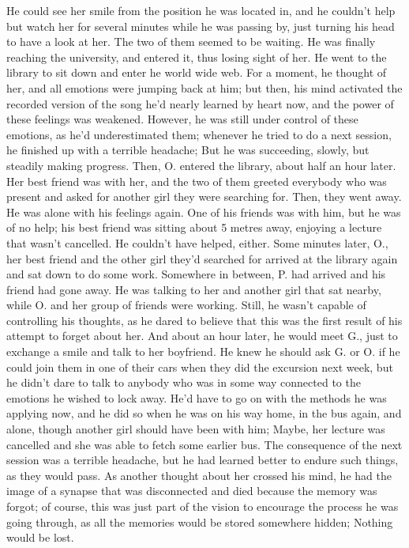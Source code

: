 He could see her smile from the position he was located in, and he couldn't help but watch her for several minutes while he was passing by, just turning his head to have a look at her. 
The two of them seemed to be waiting. 
He was finally reaching the university, and entered it, thus losing sight of her. 
He went to the library to sit down and enter he world wide web. 
For a moment, he thought of her, and all emotions were jumping back at him; but then, his mind activated the recorded version of the song he'd nearly learned by heart now, and the power of these feelings was weakened. 
However, he was still under control of these emotions, as he'd underestimated them; whenever he tried to do a next session, he finished up with a terrible headache; But he was succeeding, slowly, but steadily making progress. 
Then, O. entered the library, about half an hour later. 
Her best friend was with her, and the two of them greeted everybody who was present and asked for another girl they were searching for. 
Then, they went away. 
He was alone with his feelings again. 
One of his friends was with him, but he was of no help; his best friend was sitting about 5 metres away, enjoying a lecture that wasn't cancelled. 
He couldn't have helped, either. 
Some minutes later, O., her best friend and the other girl they'd searched for arrived at the library again and sat down to do some work. 
Somewhere in between, P. had arrived and his friend had gone away. 
He was talking to her and another girl that sat nearby, while O. and her group of friends were working. 
Still, he wasn't capable of controlling his thoughts, as he dared to believe that this was the first result of his attempt to forget about her. 
And about an hour later, he would meet G., just to exchange a smile and talk to her boyfriend. 
He knew he should ask G. or O. if he could join them in one of their cars when they did the excursion next week, but he didn't dare to talk to anybody who was in some way connected to the emotions he wished to lock away. 
He'd have to go on with the methods he was applying now, and he did so when he was on his way home, in the bus again, and alone, though another girl should have been with him; Maybe, her lecture was cancelled and she was able to fetch some earlier bus. 
The consequence of the next session was a terrible headache, but he had learned better to endure such things, as they would pass. 
As another thought about her crossed his mind, he had the image of a synapse that was disconnected and died because the memory was forgot; of course, this was just part of the vision to encourage the process he was going through, as all the memories would be stored somewhere hidden; Nothing would be lost. 

